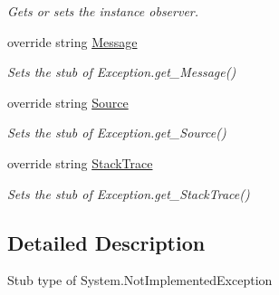 \begin{DoxyCompactItemize}
\begin{DoxyCompactList}\small\item\em Gets or sets the instance observer.\end{DoxyCompactList}\item 
override string \hyperlink{class_system_1_1_fakes_1_1_stub_not_implemented_exception_a7462a3b32d7a5ebf8eb8355153eb0ca5}{Message}
\begin{DoxyCompactList}\small\item\em Sets the stub of Exception.\-get\-\_\-\-Message()\end{DoxyCompactList}\item 
override string \hyperlink{class_system_1_1_fakes_1_1_stub_not_implemented_exception_a4bc56d57a05ea403cdf545813ee6ff53}{Source}
\begin{DoxyCompactList}\small\item\em Sets the stub of Exception.\-get\-\_\-\-Source()\end{DoxyCompactList}\item 
override string \hyperlink{class_system_1_1_fakes_1_1_stub_not_implemented_exception_a8975f1cc226f3af4b02bbb95f8d48e36}{Stack\-Trace}
\begin{DoxyCompactList}\small\item\em Sets the stub of Exception.\-get\-\_\-\-Stack\-Trace()\end{DoxyCompactList}\end{DoxyCompactItemize}


\subsection{Detailed Description}
Stub type of System.\-Not\-Implemented\-Exception



